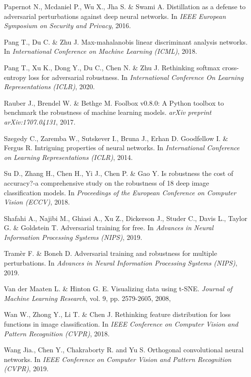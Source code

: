 \documentclass[preprint,review,12pt]{elsarticle}
\numberwithin{equation}{section}
\begin{document}
\begin{thebibliography}{99}
Papernot N., Mcdaniel P., Wu X., Jha S. \& Swami  A.
Distillation as a defense to adversarial perturbations against deep neural networks.
In \textit{IEEE European Symposium on Security and Privacy}, 2016.

Pang T., Du C. \& Zhu J.
Max-mahalanobis linear discriminant analysis networks.
In \textit{International Conference on Machine Learning (ICML)}, 2018.

Pang T., Xu K., Dong Y., Du C., Chen N. \& Zhu J.
Rethinking softmax cross-entropy loss for adversarial robustness.
In \textit{International Conference On Learning Representations (ICLR)}, 2020.

Rauber J., Brendel W. \&  Bethge M.
Foolbox v0.8.0: A Python toolbox to benchmark the robustness of machine learning models.
\textit{arXiv preprint arXiv:1707.04131}, 2017.

Szegedy C., Zaremba W., Sutskever I., Bruna J., Erhan D.  Goodfellow I. \& Fergus R.
Intriguing properties of neural networks.
In \textit{International Conference on Learning Representations (ICLR)}, 2014.

Su D., Zhang H., Chen H.,  Yi J., Chen P. \& Gao Y.
Is robustness the cost of accuracy?-a comprehensive study on the robustness of 18 deep image classification models.
In \textit{Proceedings of the European Conference on Computer Vision (ECCV)}, 2018.

Shafahi A., Najibi M., Ghiasi A., Xu Z., Dickerson J., Studer C., Davis L., Taylor G. \& Goldstein T.
Adversarial training for free.
In \textit{Advances in Neural Information Processing Systems (NIPS)}, 2019.

Tram\`{e}r F. \& Boneh D.
Adversarial training and robustness for multiple perturbations.
In \textit{Advances in Neural Information Processing Systems (NIPS)}, 2019.

Van der Maaten L. \&  Hinton G. E.
Visualizing data using t-SNE.
\textit{Journal of Machine Learning Research}, vol. 9, pp. 2579-2605, 2008,

Wan W., Zhong Y., Li T. \& Chen J.
Rethinking feature distribution for loss functions in image classification.
In \textit{IEEE Conference on Computer Vision and Pattern Recognition (CVPR)}, 2018.

Wang Jia., Chen Y., Chakraborty R. and Yu S.
Orthogonal convolutional neural networks.
In \textit{IEEE Conference on Computer Vision and Pattern Recognition (CVPR)}, 2019.


\end{thebibliography}
\end{document}
